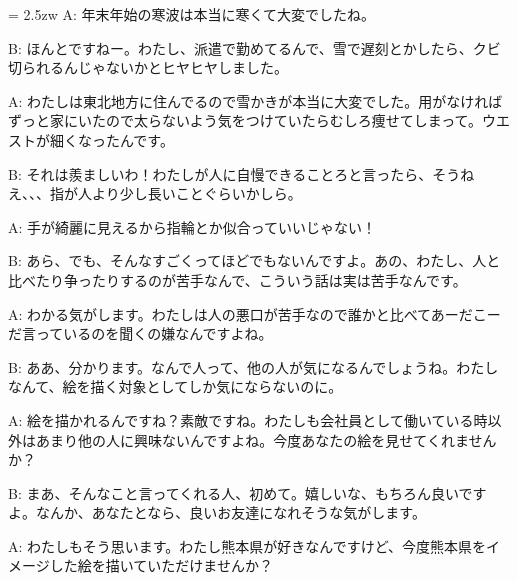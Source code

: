\documentclass[11pt]{amsart}
\title{}
\author{}
\newenvironment{hangall}[1]{\hangindent = 2.5zw\everypar{\hangindent = 2.5zw}}{}
\begin{document}
\maketitle
\begin{hangall}{}%
A: 年末年始の寒波は本当に寒くて大変でしたね。

B: ほんとですねー。わたし、派遣で勤めてるんで、雪で遅刻とかしたら、クビ切られるんじゃないかとヒヤヒヤしました。

A: わたしは東北地方に住んでるので雪かきが本当に大変でした。用がなければずっと家にいたので太らないよう気をつけていたらむしろ痩せてしまって。ウエストが細くなったんです。

B: それは羨ましいわ！わたしが人に自慢できることろと言ったら、そうねえ、、、指が人より少し長いことぐらいかしら。

A: 手が綺麗に見えるから指輪とか似合っていいじゃない！

B: あら、でも、そんなすごくってほどでもないんですよ。あの、わたし、人と比べたり争ったりするのが苦手なんで、こういう話は実は苦手なんです。

A: わかる気がします。わたしは人の悪口が苦手なので誰かと比べてあーだこーだ言っているのを聞くの嫌なんですよね。

B: ああ、分かります。なんで人って、他の人が気になるんでしょうね。わたしなんて、絵を描く対象としてしか気にならないのに。

A: 絵を描かれるんですね？素敵ですね。わたしも会社員として働いている時以外はあまり他の人に興味ないんですよね。今度あなたの絵を見せてくれませんか？

B: まあ、そんなこと言ってくれる人、初めて。嬉しいな、もちろん良いですよ。なんか、あなたとなら、良いお友達になれそうな気がします。

A: わたしもそう思います。わたし熊本県が好きなんですけど、今度熊本県をイメージした絵を描いていただけませんか？
\end{hangall}
\end{document}
